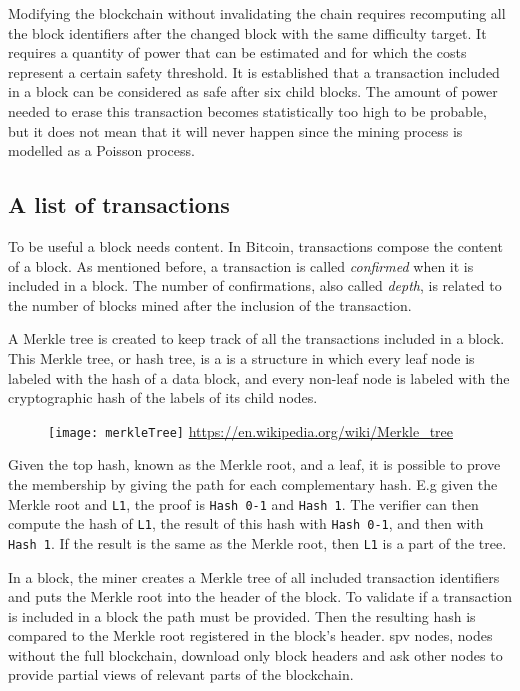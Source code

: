 Modifying the blockchain without invalidating the chain requires recomputing all
the block identifiers after the changed block with the same difficulty target. It requires a quantity of power
that can be estimated and for which the costs represent a certain safety
threshold. It is established that a transaction included in a block can be
considered as safe after six child blocks. The amount of power needed to erase
this transaction becomes statistically too high to be probable, but it does not
mean that it will never happen since the mining process is modelled as a Poisson
process.

\subsection{A list of transactions}

To be useful a block needs content. In Bitcoin, transactions compose the
content of a block. As mentioned before, a transaction is called
\textit{confirmed} when it is included in a block. The number of confirmations,
also called \textit{depth}, is related to the number of blocks mined after the
inclusion of the transaction.

A Merkle tree is created to keep track of all the transactions included in a
block. This Merkle tree, or hash tree, is a is a structure in which every leaf
node is labeled with the hash of a data block, and every non-leaf node is
labeled with the cryptographic hash of the labels of its child nodes.

\begin{figure}[H]
	\centering
	\texttt{[image: merkleTree]}
	{\url{https://en.wikipedia.org/wiki/Merkle_tree}}
	\label{fig:merkleTree}
\end{figure}

Given the top hash, known as the Merkle root, and a leaf, it is possible to prove the
membership by giving the path for each complementary hash. E.g given the
Merkle root and \texttt{L1}, the proof is \texttt{Hash 0-1} and \texttt{Hash 1}.
The verifier can then compute the hash of \texttt{L1}, the result of this hash
with \texttt{Hash 0-1}, and then with \texttt{Hash 1}. If the result is the same
as the Merkle root, then \texttt{L1} is a part of the tree.

In a block, the miner creates a Merkle tree of all included transaction
identifiers and puts the Merkle root into the header of the block. To validate
if a transaction is included in a block the path must be provided. Then the
resulting hash is compared to the Merkle root registered in the block's header.
\gls{spv} nodes, nodes without the full blockchain, download only block headers
and ask other nodes to provide partial views of relevant parts of the blockchain.


